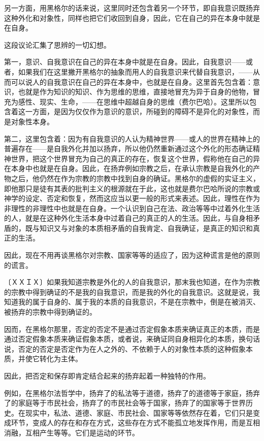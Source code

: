 \documentclass[a4paper,twoside,12pt,AutoFakeBold]{ctexart}
\begin{document}
另一方面，用黑格尔的话来说，这里同时还包含着另一个环节，即自我意识既扬弃这种外化和对象性，同样也把它们收回到自身，因此，它在自己的异在本身中就是在自身。

这段议论汇集了思辨的一切幻想。

第一，意识、自我意识在自己的异在本身中就是在自身。因此，自我意识——或者，如果我们在这里撇开黑格尔的抽象而用人的自我意识来代替自我意识，——从而可以说人的自我意识在自己的异在本身中，也就是在自身。这里首先包含着：意识，也就是作为知识的知识、作为思维的思维，直接地冒充为异于自身的他物，冒充为感性、现实、生命，——在思维中超越自身的思维（费尔巴哈）。这里所以包含着这一方面，是因为仅仅作为意识的意识，所碰到的障碍不是异化的对象性，而是对象性本身。

第二，这里包含着：因为有自我意识的人认为精神世界——或人的世界在精神上的普遍存在——是自我外化并加以扬弃，所以他仍然重新通过这个外化的形态确证精神世界，把这个世界冒充为自己的真正的存在，恢复这个世界，假称他在自己的异在本身中也就是在自身。因此，在扬弃例如宗教之后，在承认宗教是自我外化的产物之后，他仍然在作为宗教的宗教中找到自身的确证。黑格尔的虚假的实证主义，即他那只是徒有其表的批判主义的根源就在于此，这也就是费尔巴哈所说的宗教或神学的设定、否定和恢复，然而这应当以更一般的形式来表述。因此，理性在作为非理性的非理性中也就是在自身。一个认识到自己在法、政治等等中过着外化生活的人，就是在这种外化生活本身中过着自己的真正的人的生活。因此，与自身相矛盾的，既与知识又与对象的本质相矛盾的自我肯定、自我确证，是真正的知识和真正的生活。

因此，现在不用再谈黑格尔对宗教、国家等等的适应了，因为这种谎言是他的原则的谎言。

〔ＸＸＩＸ〕如果我知道宗教是外化的人的自我意识，那末我也知道，在作为宗教的宗教中得到确证的不是我的自我意识，而是我的外化的自我意识。这就是说，我知道我的属于自身的、属于我的本质的自我意识，不是在宗教中，倒是在被消灭、被扬弃的宗教中得到确证的。

因而，在黑格尔那里，否定的否定不是通过否定假象本质来确证真正的本质，而是通过否定假象本质来确证假象本质，或者说，来确证同自身相异化的本质，换句话说，否定的否定是否定作为在人之外的、不依赖于人的对象性本质的这种假象本质，并使它转化为主体。

因此，把否定和保存即肯定结合起来的扬弃起着一种独特的作用。

例如，在黑格尔法哲学中，扬弃了的私法等于道德，扬弃了的道德等于家庭，扬弃了的家庭等于市民社会，扬弃了的市民社会等于国家，扬弃了的国家等于世界历史。在现实中，私法、道德、家庭、市民社会、国家等等依然存在着，它们只是变成环节，变成人的存在和存在方式，这些存在方式不能孤立地发挥作用，而是互相消融，互相产生等等。它们是运动的环节。
\end{document}
